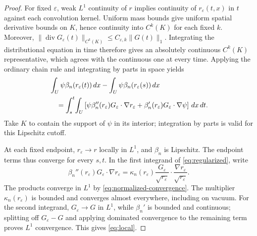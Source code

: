 \documentclass[11pt]{article}
\newcommand{\dd}{\,dx}
\newcommand{\dt}{\,dt}
\newcommand{\grad}{\nabla}
\newcommand{\Div}{\operatorname{div}}
\begin{document}
\begin{proof}
For fixed $\varepsilon$, weak $L^1$ continuity of $r$ implies continuity of
$r_\varepsilon(t,x)$ in $t$ against each convolution kernel. Uniform mass
bounds give uniform spatial derivative bounds on $K$, hence continuity into
$C^k(K)$ for each fixed $k$. Moreover,
$\|\Div G_\varepsilon(t)\|_{C^k(K)}\leq C_{\varepsilon,k}\|G(t)\|_1$.
Integrating the distributional equation in time therefore gives an absolutely
continuous $C^k(K)$ representative, which agrees with the continuous one
at every time. Applying the ordinary chain rule and integrating by parts in
space yields
\begin{align}\label{eq:regularized}
 &\int_U\psi\beta_n(r_\varepsilon(t))\dd
       -\int_U\psi\beta_n(r_\varepsilon(s))\dd\notag\\
 &\quad=\int_s^t\!\int_U\left[
 \psi\beta_n''(r_\varepsilon)
                   G_\varepsilon\cdot\grad r_\varepsilon
   +\beta_n'(r_\varepsilon)G_\varepsilon\cdot\grad\psi
                                  \right]\dd\dt.
\end{align}
Take $K$ to contain the support of $\psi$ in its interior; integration by
parts is valid for this Lipschitz cutoff.

At each fixed endpoint, $r_\varepsilon\to r$ locally in $L^1$, and
$\beta_n$ is Lipschitz. The endpoint terms thus converge for every $s,t$.
In the first integrand of \eqref{eq:regularized}, write
\[
 \beta_n''(r_\varepsilon)G_\varepsilon\cdot\grad r_\varepsilon
 =\kappa_n(r_\varepsilon)
   \frac{G_\varepsilon}{\sqrt{r_\varepsilon}}\cdot
   \frac{\grad r_\varepsilon}{\sqrt{r_\varepsilon}}.
\]
The products converge in $L^1$ by \eqref{eq:normalized-convergence}.
The multiplier $\kappa_n(r_\varepsilon)$ is bounded and converges almost
everywhere, including on vacuum. For the second integrand,
$G_\varepsilon\to G$ in $L^1$, while $\beta_n'$ is bounded and continuous;
splitting off $G_\varepsilon-G$ and applying dominated convergence to the
remaining term proves $L^1$ convergence. This gives \eqref{eq:local}.
\end{proof}
\end{document}

